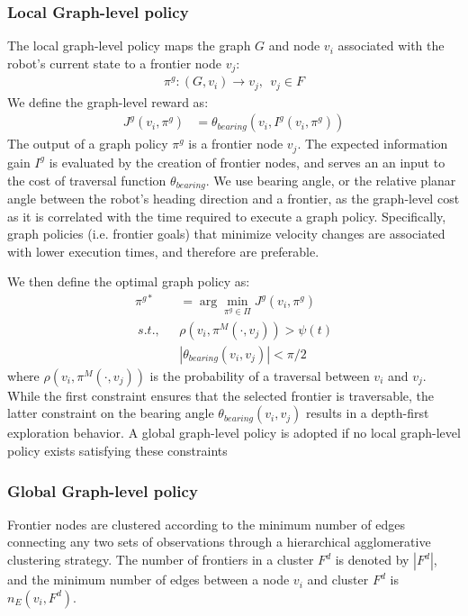 \documentclass{article}
\begin{document}
\subsubsection{Local Graph-level policy}
The local graph-level policy maps the graph $G$ and node $v_i$ associated with the robot's current state to a frontier node $v_j$:
\begin{align}
  \pi^g: (G,v_i) \rightarrow v_j,~~ v_j \in F
\end{align}
We define the graph-level reward as:
\begin{align}
    J^{g}(v_i, \pi^g) &= \theta_{bearing}(v_i, I^g(v_i,\pi^g)) 
\end{align}
The output of a graph policy $\pi^g$ is a frontier node $v_j$. The expected information gain $I^g$ is evaluated by the creation of frontier nodes, and serves an an input to the cost of traversal function $\theta_{bearing}$. We use bearing angle, or the relative planar angle between the robot's heading direction and a frontier, as the graph-level cost as it is correlated with the time required to execute a graph policy. Specifically, graph policies (i.e. frontier goals) that minimize velocity changes are associated with lower execution times, and therefore are preferable.  

We then define the optimal graph policy as:
\begin{align}
    \pi^{g*} &= \arg\min_{\pi^g \in \Pi} J^{g}(v_i, \pi^g) \nonumber \\
    ~s.t.,~~~ & \rho(v_i,\pi^M(\cdot,v_j)) > \psi(t) \nonumber \\
    & |\theta_{bearing}(v_i, v_j)| < \pi/2 
    \label{eq:local_constraint}
\end{align}
where $\rho(v_i,\pi^M(\cdot,v_j))$ is the probability of a traversal between $v_i$ and $v_j$. While the first constraint ensures that the selected frontier is traversable, the latter constraint on the bearing angle $\theta_{bearing}(v_i, v_j)$ results in a depth-first exploration behavior. A global graph-level policy is adopted if no local graph-level policy exists satisfying these constraints

\subsubsection{Global Graph-level policy}
Frontier nodes are clustered according to the minimum number of edges connecting any two sets of observations through a hierarchical agglomerative clustering strategy. The number of frontiers in a cluster $F^d$ is denoted by $|F^d|$, and the minimum number of edges between a node $v_i$ and cluster $F^d$ is $n_E(v_i,F^d)$. 
\end{document}
